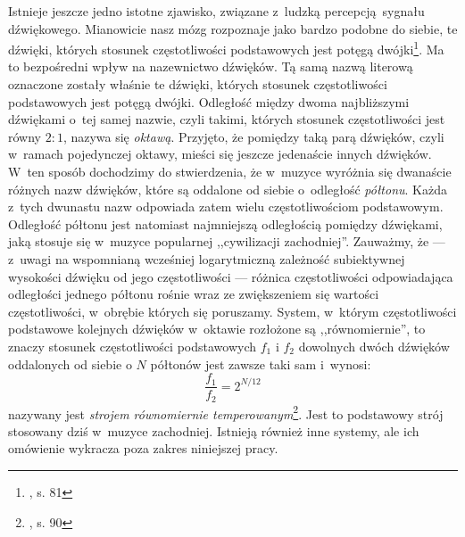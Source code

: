 Istnieje jeszcze jedno istotne zjawisko, związane z~ludzką percepcją sygnału dźwiękowego. Mianowicie nasz mózg rozpoznaje jako bardzo podobne do siebie, te dźwięki, których stosunek częstotliwości podstawowych jest potęgą dwójki\footnote{\cite{lerch_introduction_2012}, s. 81}. Ma to bezpośredni wpływ na nazewnictwo dźwięków. Tą samą nazwą literową oznaczone zostały właśnie te dźwięki, których stosunek częstotliwości podstawowych jest potęgą dwójki. Odległość między dwoma najbliższymi dźwiękami o~tej samej nazwie, czyli takimi, których stosunek częstotliwości jest równy $2:1$, nazywa się \emph{oktawą}. Przyjęto, że pomiędzy taką parą dźwięków, czyli w~ramach pojedynczej oktawy, mieści się jeszcze jedenaście innych dźwięków. W~ten sposób dochodzimy do stwierdzenia, że w~muzyce wyróżnia się dwanaście różnych nazw dźwięków, które są oddalone od siebie o~odległość \emph{półtonu}. Każda z~tych dwunastu nazw odpowiada zatem wielu częstotliwościom podstawowym. Odległość półtonu jest natomiast najmniejszą odległością pomiędzy dźwiękami, jaką stosuje się w~muzyce popularnej ,,cywilizacji zachodniej''. Zauważmy, że --- z~uwagi na wspomnianą wcześniej logarytmiczną zależność subiektywnej wysokości dźwięku od jego częstotliwości --- różnica częstotliwości odpowiadająca odległości jednego półtonu rośnie wraz ze zwiększeniem się wartości częstotliwości, w~obrębie których się poruszamy. System, w~którym częstotliwości podstawowe kolejnych dźwięków w~oktawie rozłożone są ,,równomiernie'', to znaczy stosunek częstotliwości podstawowych $f_1$ i $f_2$ dowolnych dwóch dźwięków oddalonych od siebie o $N$ półtonów jest zawsze taki sam i~wynosi:
\begin{equation} \label{eq:stroj_rownomiernie_temperowany}
    \frac{f_1}{f_2} = 2^{N/12}
\end{equation}
nazywany jest \emph{strojem równomiernie temperowanym}\footnote{\cite{lerch_introduction_2012}, s. 90}. Jest to podstawowy strój stosowany dziś w~muzyce zachodniej. Istnieją również inne systemy, ale ich omówienie wykracza poza zakres niniejszej pracy.

